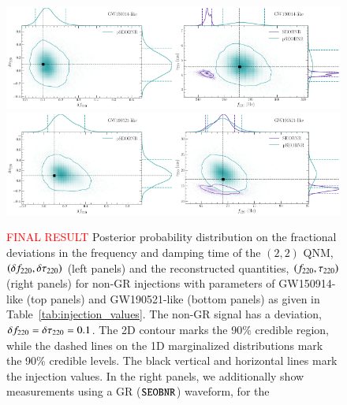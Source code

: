 \begin{figure}%
\begin{center}
        \includegraphics[width=0.5\textwidth]{figures/GW150914_simulated_signal_0p1_deltaf220_deltatau220.png}\includegraphics[width=0.5\textwidth]{figures/GW150914_simulated_signal_0p1_gr_ngr_fngrtaungr.png}
        \includegraphics[width=0.5\textwidth]{figures/GW190521_simulated_signal_0p1_deltaf220_deltatau220.png}\includegraphics[width=0.5\textwidth]{figures/GW190521_simulated_signal_0p1_gr_ngr_fngrtaungr.png}
        \caption{\textcolor{red}{FINAL RESULT} Posterior probability distribution on the fractional deviations in the frequency and damping time of the $(2,2)$ QNM, $(\delta f_{\text{220}},\delta \tau_{\text{220}})$ (left panels) and the reconstructed quantities, $(f_{\text{220}}, \tau_{\text{220}})$ (right panels) for non-GR injections \ab{($\pSEOB$)} with parameters of GW150914-like (top panels) and GW190521-like (bottom panels) as given in Table~\ref{tab:injection_values}. The non-GR signal has a deviation, $\delta f_{\text{220}} = \delta \tau_{\text{220}} = 0.1$. The 2D contour marks the 90\% credible region, while the dashed lines on the 1D marginalized distributions mark the 90\% credible levels. The black vertical and horizontal lines mark the injection values. In the right panels, we additionally show measurements using a GR ($\texttt{SEOBNR}$) waveform, for the
}
\end{center}
\end{figure}
